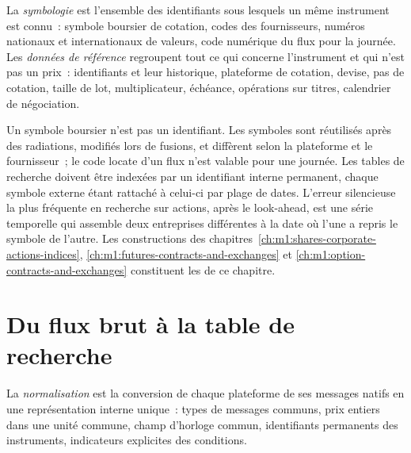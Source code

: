 \begin{definition}\label{def:m1:reading-market-data:refdata}
La \emph{symbologie} est l'ensemble des identifiants sous lesquels un
même instrument est connu~: symbole boursier de cotation, codes des fournisseurs, numéros nationaux et
internationaux de valeurs, code numérique du flux pour la journée.
Les \emph{données de référence} regroupent tout ce qui concerne
l'instrument et qui n'est pas un prix~: identifiants et leur historique, plateforme de cotation,
devise, pas de cotation, taille de lot, multiplicateur, échéance, opérations sur titres,
calendrier de négociation.
\end{definition}

Un symbole boursier n'est pas un identifiant. Les symboles sont réutilisés après des radiations, modifiés
lors de fusions, et diffèrent selon la plateforme et le fournisseur~; le code locate d'un flux n'est valable
pour une journée. Les tables de recherche doivent être indexées par un identifiant interne
permanent, chaque symbole externe étant rattaché à celui-ci par plage de dates. L'erreur
silencieuse la plus fréquente en recherche sur actions, après le look-ahead, est une
série temporelle qui assemble deux entreprises différentes à la date où l'une a repris le
symbole de l'autre. Les constructions des chapitres~\ref{ch:m1:shares-corporate-actions-indices},
\ref{ch:m1:futures-contracts-and-exchanges} et
\ref{ch:m1:option-contracts-and-exchanges} constituent les  de ce chapitre.

\section{Du flux brut à la table de recherche}

\begin{definition}[Normalisation]\label{def:m1:reading-market-data:norm}
La \emph{normalisation} est la conversion de chaque plateforme
de ses messages natifs en une représentation interne unique~: types de messages communs,
prix entiers dans une unité commune, champ d'horloge commun, identifiants permanents
des instruments, indicateurs explicites des conditions.
\end{definition}

